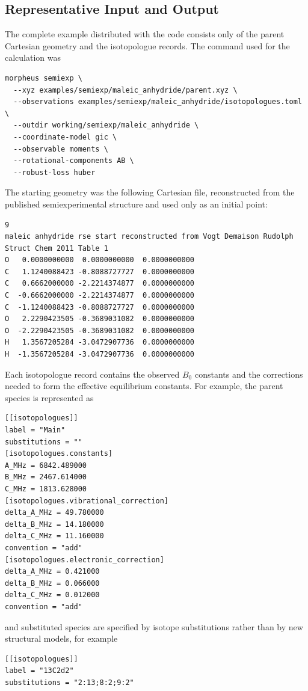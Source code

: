 \documentclass[12pt]{article}
\begin{document}
\subsection{Representative Input and Output}
\label{sec:si-input-output}

The complete example distributed with the code consists only of the parent
Cartesian geometry and the isotopologue records. The command used for the
calculation was
\begin{lstlisting}
morpheus semiexp \
  --xyz examples/semiexp/maleic_anhydride/parent.xyz \
  --observations examples/semiexp/maleic_anhydride/isotopologues.toml \
  --outdir working/semiexp/maleic_anhydride \
  --coordinate-model gic \
  --observable moments \
  --rotational-components AB \
  --robust-loss huber
\end{lstlisting}
The starting geometry was the following Cartesian file, reconstructed from
the published semiexperimental structure and used only as an initial point:
\begin{lstlisting}
9
maleic anhydride rse start reconstructed from Vogt Demaison Rudolph Struct Chem 2011 Table 1
O   0.0000000000  0.0000000000  0.0000000000
C   1.1240088423 -0.8088727727  0.0000000000
C   0.6662000000 -2.2214374877  0.0000000000
C  -0.6662000000 -2.2214374877  0.0000000000
C  -1.1240088423 -0.8088727727  0.0000000000
O   2.2290423505 -0.3689031082  0.0000000000
O  -2.2290423505 -0.3689031082  0.0000000000
H   1.3567205284 -3.0472907736  0.0000000000
H  -1.3567205284 -3.0472907736  0.0000000000
\end{lstlisting}
Each isotopologue record contains the observed $B_0$ constants and the
corrections needed to form the effective equilibrium constants. For example,
the parent species is represented as
\begin{lstlisting}
[[isotopologues]]
label = "Main"
substitutions = ""
[isotopologues.constants]
A_MHz = 6842.489000
B_MHz = 2467.614000
C_MHz = 1813.628000
[isotopologues.vibrational_correction]
delta_A_MHz = 49.780000
delta_B_MHz = 14.180000
delta_C_MHz = 11.160000
convention = "add"
[isotopologues.electronic_correction]
delta_A_MHz = 0.421000
delta_B_MHz = 0.066000
delta_C_MHz = 0.012000
convention = "add"
\end{lstlisting}
and substituted species are specified by isotope substitutions rather than by
new structural models, for example
\begin{lstlisting}
[[isotopologues]]
label = "13C2d2"
substitutions = "2:13;8:2;9:2"
\end{lstlisting}
\end{document}
